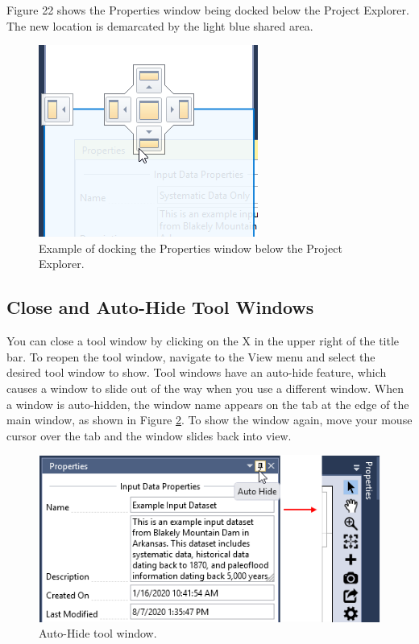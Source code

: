 \documentclass[
]{book}
\begin{document}
Figure 22 shows the Properties window being docked below the Project Explorer. The new location is demarcated by the light blue shared area.

\begin{figure}

{\centering \includegraphics{images/figure22} 

}

\caption{Example of docking the Properties window below the Project Explorer.}\label{fig:figure-22}
\end{figure}

\hypertarget{close-and-auto-hide-tool-windows}{%
\subsection{Close and Auto-Hide Tool Windows}\label{close-and-auto-hide-tool-windows}}

You can close a tool window by clicking on the X in the upper right of the title bar. To reopen the tool window, navigate to the View menu and select the desired tool window to show. Tool windows have an auto-hide feature, which causes a window to slide out of the way when you use a different window. When a window is auto-hidden, the window name appears on the tab at the edge of the main window, as shown in Figure \ref{fig:figure-23}. To show the window again, move your mouse cursor over the tab and the window slides back into view.

\begin{figure}

{\centering \includegraphics{images/figure23} 

}

\caption{Auto-Hide tool window.}\label{fig:figure-23}
\end{figure}
\end{document}
